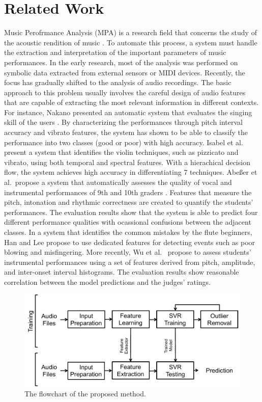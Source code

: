 \documentclass{article}
\begin{document}
\section{Related Work}\label{sec:relatedwork}
Music Perofrmance Analysis (MPA) is a research field that concerns the study of the acoustic rendition of music \cite{Lerch2012}. To automate this process, a system must handle the extraction and interpretation of the important parameters of music performances. In the early research, most of the analysis was performed on symbolic data extracted from external sensors or MIDI devices. Recently, the focus has gradually shifted to the analysis of audio recordings. The basic approach to this problem usually involves the careful design of audio features that are capable of extracting the most relevant information in different contexts. For instance, Nakano presented an automatic system that evaluates the singing skill of the users \cite{Nakano2006a}. By characterizing the performances through pitch interval accuracy and vibrato features, the system has shown to be able to classify the performance into two classes (good or poor) with high accuracy. Isabel et al.~ present a system that identifies the violin techniques, such as pizzicato and vibrato, using both temporal and spectral features\cite{Barbancho2009}. With a hierachical decision flow, the system achieves high accuracy in differentiating 7 techniques. Abe{\ss}er et al.\ propose a system that automatically assesses the quality of vocal and instrumental performances of 9th and 10th graders \cite{Abeßer2013}. Features that measure the pitch, intonation and rhythmic correctness are created to quantify the students' performances. The evaluation results show that the system is able to predict four different performance qualities with ocassional confusions between the adjacent classes. In a system that identifies the common mistakes by the flute beginners, Han and Lee propose to use dedicated features for detecting events such as poor blowing and misfingering\cite{Han2014}. More recently, Wu et al.~ propose to assess students' instrumental performances using a set of features derived from pitch, amplitude, and inter-onset interval histograms\cite{Wu2016}. The evaluation results show reasonable correlation between the model predictions and the judges' ratings. 

\begin{figure}
\centering
\includegraphics[width = 8 cm]{./figs/flowchart.pdf}
\caption{The flowchart of the proposed method.}
\label{fig:flowchart}
\end{figure}
\end{document}
